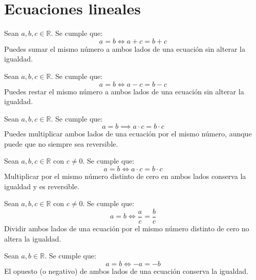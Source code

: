 \documentclass[a4,11pt]{aleph-notas}
\begin{document}
\encabezado

\section{Ecuaciones lineales}

\begin{teo}
    Sean \(a, b, c \in \mathbb{R}\). Se cumple que:  
    \[
        a = b \iff a + c = b + c
    \]  
    Puedes sumar el mismo número a ambos lados de una ecuación sin alterar la igualdad.
\end{teo}

\begin{teo}
    Sean \(a, b, c \in \mathbb{R}\). Se cumple que:  
    \[
        a = b \iff a - c = b - c
    \]  
    Puedes restar el mismo número a ambos lados de una ecuación sin alterar la igualdad.
\end{teo}

\begin{teo}
    Sean \(a, b, c \in \mathbb{R}\). Se cumple que:  
    \[
        a = b \implies a \cdot c = b \cdot c
    \]  
    Puedes multiplicar ambos lados de una ecuación por el mismo número, aunque puede que no siempre sea reversible.
\end{teo}

\begin{teo}
    Sean \(a, b, c \in \mathbb{R}\) con \(c \neq 0\). Se cumple que:  
    \[
        a = b \iff a \cdot c = b \cdot c
    \]  
    Multiplicar por el mismo número distinto de cero en ambos lados conserva la igualdad y es reversible.
\end{teo}

\begin{teo}
    Sean \(a, b, c \in \mathbb{R}\) con \(c \neq 0\). Se cumple que:  
    \[
        a = b \iff \dfrac{a}{c} = \dfrac{b}{c}
    \]  
    Dividir ambos lados de una ecuación por el mismo número distinto de cero no altera la igualdad.
\end{teo}

\begin{teo}
    Sean \(a, b \in \mathbb{R}\). Se cumple que:  
    \[
        a = b \iff -a = -b
    \]  
    El opuesto (o negativo) de ambos lados de una ecuación conserva la igualdad.
\end{teo}
\end{document}
